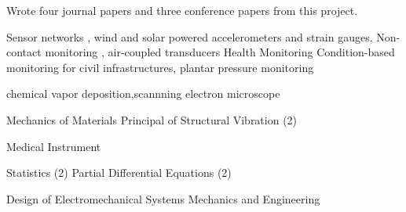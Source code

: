 \begin{cventries}
       \item {Wrote four journal papers and three conference papers from this project.}





  \cvskill
    {Sensor networks} %
    {, wind and solar powered accelerometers and strain gauges,} %
   \cvskill
    {Non-contact monitoring} %
    {, air-coupled transducers} %
   \cvskill
    {Health Monitoring} %
    {Condition-based monitoring for civil infrastructures, plantar pressure monitoring} %
     




\end{cventries}


chemical vapor deposition,scannning electron microscope

	\nocite{he2015damage}
	\nocite{he2016lamb}
	\nocite{he2016lamb2DNZLCC}
	\nocite{he2016quantitative}
	\nocite{he2017Radon}
	\nocite{he2017Least}
	\nocite{leser2017Guided}
	\nocite{he2017Multi}
	\nocite{he2017Ultrasonic}
	\printbibliography[
	heading=none, 
	sorting=ydnt
	]
	
    \nocite{Conf_he2016Enhanced}
    \nocite{Conf_cao2010simulation2}
    \nocite{Conf_he2017bvid}
    \nocite{Conf_he2016Rapid}	
    \nocite{Conf_he2013damage}
	\printbibliography[
	heading=none, 
	sorting=ydnt
	]
	
	
    \nocite{yuan2013portable}
    \nocite{yuan2015integrated}
    \nocite{yuan2015guided}
    \nocite{he2016portable}
    
	\printbibliography[
	heading=none, 
	sorting=ydnt
	]
	

\begin{refsection}

\end{refsection}



\begin{refsection}

\end{refsection}
	
	


    \cvcoursev
    {}
    {}
    {}
Mechanics of Materials
Principal of Structural Vibration (2)

    {Medical Instrument}

    {Statistics (2)}
    {Partial Differential Equations (2)}

        {Design of Electromechanical Systems}
        {Mechanics and Engineering}


    